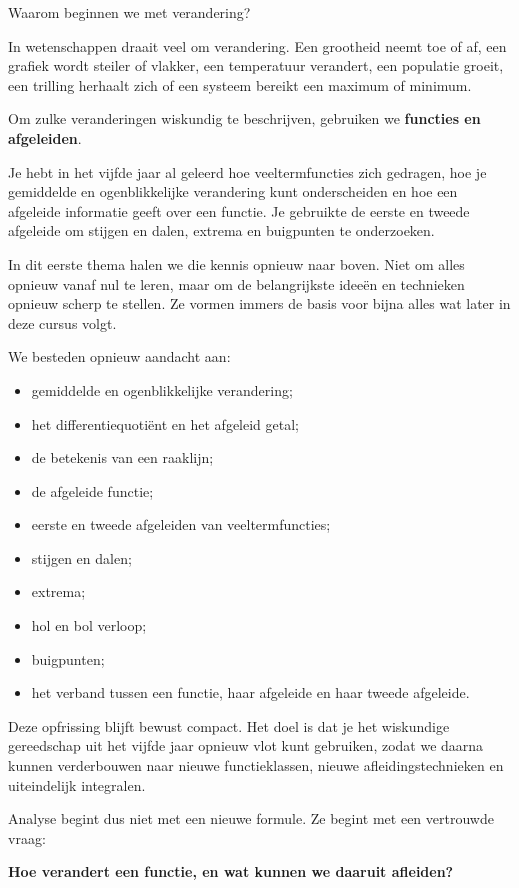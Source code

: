 \documentclass{xourse}
\begin{document}
\begin{themaintro}{Waarom beginnen we met verandering?}

  In wetenschappen draait veel om verandering.
  Een grootheid neemt toe of af, een grafiek wordt steiler of vlakker,
  een temperatuur verandert, een populatie groeit, een trilling herhaalt zich
  of een systeem bereikt een maximum of minimum.
  
  Om zulke veranderingen wiskundig te beschrijven, gebruiken we
  \textbf{functies en afgeleiden}.
  
  Je hebt in het vijfde jaar al geleerd hoe veeltermfuncties zich gedragen,
  hoe je gemiddelde en ogenblikkelijke verandering kunt onderscheiden
  en hoe een afgeleide informatie geeft over een functie.
  Je gebruikte de eerste en tweede afgeleide om stijgen en dalen,
  extrema en buigpunten te onderzoeken.
  
  In dit eerste thema halen we die kennis opnieuw naar boven.
  Niet om alles opnieuw vanaf nul te leren, maar om de belangrijkste ideeën
  en technieken opnieuw scherp te stellen.
  Ze vormen immers de basis voor bijna alles wat later in deze cursus volgt.
  
  We besteden opnieuw aandacht aan:
  
  \begin{itemize}
  \item gemiddelde en ogenblikkelijke verandering;
  \item het differentiequotiënt en het afgeleid getal;
  \item de betekenis van een raaklijn;
  \item de afgeleide functie;
  \item eerste en tweede afgeleiden van veeltermfuncties;
  \item stijgen en dalen;
  \item extrema;
  \item hol en bol verloop;
  \item buigpunten;
  \item het verband tussen een functie, haar afgeleide en haar tweede afgeleide.
  \end{itemize}
  
  Deze opfrissing blijft bewust compact.
  Het doel is dat je het wiskundige gereedschap uit het vijfde jaar opnieuw
  vlot kunt gebruiken, zodat we daarna kunnen verderbouwen naar nieuwe
  functieklassen, nieuwe afleidingstechnieken en uiteindelijk integralen.
  
  Analyse begint dus niet met een nieuwe formule.
  Ze begint met een vertrouwde vraag:
  
  \begin{center}
  \textbf{Hoe verandert een functie, en wat kunnen we daaruit afleiden?}
  \end{center}
  
  \end{themaintro}
\end{document}
